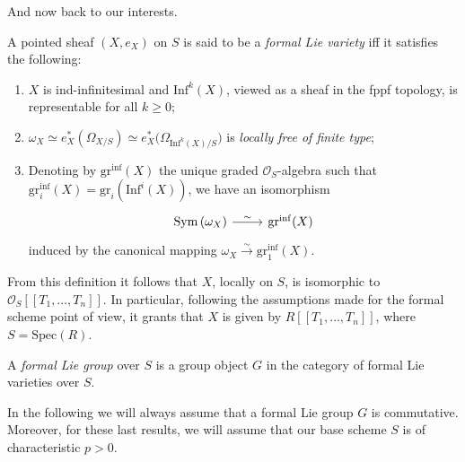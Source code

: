 \noindent
And now back to our interests.
\begin{defn}\label{defn:FormalLieVarfppf}
	A pointed sheaf $\left(X, e_X\right)$ on $S$ is said to be
	a {\em formal Lie variety} iff it satisfies the following:
\begin{enumerate}
	\item $X$ is ind-infinitesimal and $\mathrm{Inf}^k(X)$, viewed
		as a sheaf in the fppf topology,
		is representable for all $k \geq 0$;
	\item $\omega_X \simeq
		e_X^* \left( \Omega_{X/S} \right) \simeq
		e_X^* \big( \Omega_{\mathrm{Inf}^k(X)/S} \big)$
		is {\em locally free of finite type};
	\item Denoting by $\mathrm{gr}^{\mathrm{inf}}(X)$ the unique graded $\mathcal{O}_{ S }$-algebra
		such that $\mathrm{gr}^{\mathrm{inf}}_i(X) = \mathrm{gr}_i(\mathrm{Inf}^i(X))$,
		we have an isomorphism
		\begin{equation*}
		\begin{tikzcd}[row sep = 0ex
			,/tikz/column 1/.append style={anchor=base east}
			,/tikz/column 2/.append style={anchor=base west}]
		\mathrm{Sym}\left( \omega_X \right) \arrow[r, "\sim", rightarrow] &
				\mathrm{gr}^{\mathrm{inf}}(X)
		\end{tikzcd}
		\end{equation*}
		induced by the canonical mapping
		$\omega_X \xrightarrow{\sim} \mathrm{gr}_1^{\mathrm{inf}}(X)$.
\end{enumerate}
\end{defn}


\begin{rem}\label{rem:FormalLieVarietyPowerSeries}
	From this definition it follows that $X$, locally on $S$,
	is isomorphic to $\mathcal{O}_S [\![ T_1, \ldots, T_n ]\!]$.
	In particular, following the assumptions made for the formal scheme point of view,
	it grants that $X$ is given by
	$R [\![ T_1, \ldots, T_n ]\!]$,
	where $S = \mathrm{Spec}(R)$.
\end{rem}


\begin{defn}
	A {\em formal Lie group} over $S$ is a group object $G$
	in the category of formal Lie varieties over $S$.
\end{defn}


\noindent
In the following we will always assume that a formal Lie group $G$
is commutative.
Moreover, for these last results, we will assume that
our base scheme $S$ is of characteristic $p  > 0$.


